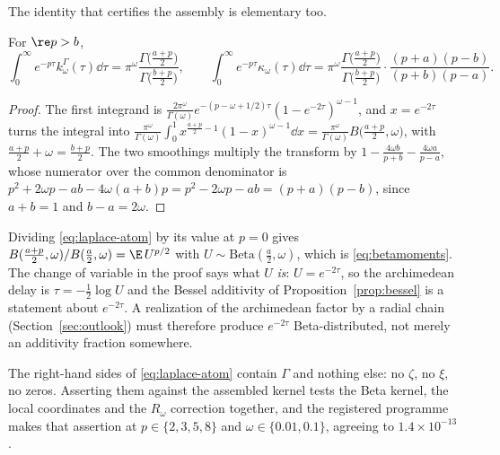 The identity that certifies the assembly is elementary too.

\begin{proposition}\label{prop:laplace}
For $\re p>b$,
\begin{equation}\label{eq:laplace-atom}
 \int_0^\infty e^{-p\tau}k^\Gamma_\omega(\tau)\dd\tau
 =\pi^\omega\frac{\Gamma\big(\frac{a+p}2\big)}{\Gamma\big(\frac{b+p}2\big)},
 \qquad
 \int_0^\infty e^{-p\tau}\kappa_\omega(\tau)\dd\tau
 =\pi^\omega\frac{\Gamma\big(\frac{a+p}2\big)}{\Gamma\big(\frac{b+p}2\big)}
 \cdot\frac{(p+a)(p-b)}{(p+b)(p-a)} .
\end{equation}
\end{proposition}
\begin{proof}
The first integrand is
$\frac{2\pi^\omega}{\Gamma(\omega)}e^{-(p-\omega+1/2)\tau}(1-e^{-2\tau})^{\omega-1}$,
and $x=e^{-2\tau}$ turns the integral into
$\frac{\pi^\omega}{\Gamma(\omega)}\int_0^1x^{\frac{a+p}2-1}(1-x)^{\omega-1}\dd x
=\frac{\pi^\omega}{\Gamma(\omega)}B\big(\frac{a+p}2,\omega\big)$, with
$\frac{a+p}2+\omega=\frac{b+p}2$. The two smoothings multiply the transform by
$1-\frac{4\omega b}{p+b}-\frac{4\omega a}{p-a}$, whose numerator over the common
denominator is $p^2+2\omega p-ab-4\omega(a+b)p=p^2-2\omega p-ab=(p+a)(p-b)$,
since $a+b=1$ and $b-a=2\omega$.
\end{proof}

\begin{remark}\label{rem:betavar}
Dividing \eqref{eq:laplace-atom} by its value at $p=0$ gives
$B(\frac{a+p}2,\omega)/B(\frac a2,\omega)=\E\,U^{p/2}$ with
$U\sim\mathrm{Beta}(\frac a2,\omega)$, which is \eqref{eq:betamoments}. The
change of variable in the proof says what $U$ \emph{is}: $U=e^{-2\tau}$, so the
archimedean delay is $\tau=-\frac12\log U$ and the Bessel additivity of
Proposition~\ref{prop:bessel} is a statement about $e^{-2\tau}$. A realization
of the archimedean factor by a radial chain (Section~\ref{sec:outlook}) must
therefore produce $e^{-2\tau}$ Beta-distributed, not merely an additivity
fraction somewhere.
\end{remark}

The right-hand sides of \eqref{eq:laplace-atom} contain $\Gamma$ and nothing
else: no $\zeta$, no $\xi$, no zeros. Asserting them against the assembled
kernel tests the Beta kernel, the local coordinates and the $R_\omega$
correction together, and the registered programme makes that assertion at
$p\in\{2,3,5,8\}$ and $\omega\in\{0.01,0.1\}$, agreeing to $1.4\times10^{-13}$.

